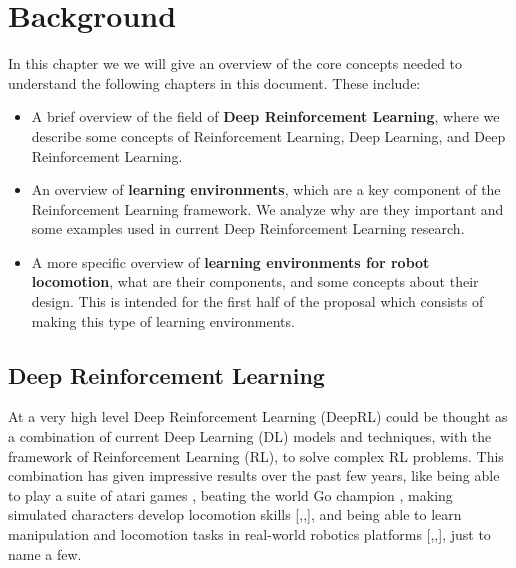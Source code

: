 \chapter{Background}
\label{ch:background}



In this chapter we we will give an overview of the core concepts needed to
understand the following chapters in this document. These include:


\begin{itemize}
    \item A brief overview of the field of \textbf{Deep Reinforcement Learning}, where
          we describe some concepts of Reinforcement Learning, Deep Learning, and Deep
          Reinforcement Learning.
    \item An overview of \textbf{learning environments}, which are a key component of
          the Reinforcement Learning framework. We analyze why are they important 
          and some examples used in current Deep Reinforcement Learning research.
    \item A more specific overview of \textbf{learning environments for robot locomotion}, 
          what are their components, and some concepts about their design. This is
          intended for the first half of the proposal which consists of making this type
          of learning environments.
\end{itemize}


\section{Deep Reinforcement Learning}

At a very high level Deep Reinforcement Learning (DeepRL) could be thought as a combination 
of current Deep Learning (DL) models and techniques, with the framework of Reinforcement 
Learning (RL), to solve complex RL problems. This combination has given impressive 
results over the past few years, like being able to play a suite of atari games \citep{DQNAtari}, 
beating the world Go champion \citep{AlphaGo}, making simulated characters develop locomotion
skills [\citeauthor{DeepmindEmergenceLocomotion},\citeauthor{DeepTerrainRL},\citeauthor{DeepMimic}], 
and being able to learn manipulation and locomotion tasks in 
real-world robotics platforms [\citeauthor{EndToEndVisuoMotorPolicies},\citeauthor{ScalableDeepRL},\citeauthor{GoogleBrainSim2Real}],
just to name a few.

